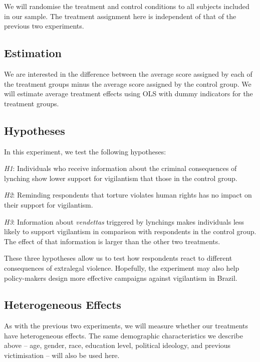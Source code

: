\documentclass[12pt,a4paper,]{article}
\begin{document}
We will randomise the treatment and control conditions to all subjects
included in our sample. The treatment assignment here is independent of
that of the previous two experiments.

\hypertarget{estimation-2}{%
\subsection{Estimation}\label{estimation-2}}

We are interested in the difference between the average score assigned
by each of the treatment groups minus the average score assigned by the
control group. We will estimate average treatment effects using OLS with
dummy indicators for the treatment groups.

\hypertarget{hypotheses-2}{%
\subsection{Hypotheses}\label{hypotheses-2}}

In this experiment, we test the following hypotheses:

\vspace{.5cm}

\noindent \emph{H1}: Individuals who receive information about the
criminal consequences of lynching show lower support for vigilantism
that those in the control group.

\vspace{.3cm}

\noindent \emph{H2}: Reminding respondents that torture violates human
rights has no impact on their support for vigilantism.

\vspace{.3cm}

\noindent \emph{H3}: Information about \emph{vendettas} triggered by
lynchings makes individuals less likely to support vigilantism in
comparison with respondents in the control group. The effect of that
information is larger than the other two treatments.

\vspace{.5cm}

These three hypotheses allow us to test how respondents react to
different consequences of extralegal violence. Hopefully, the experiment
may also help policy-makers design more effective campaigns against
vigilantism in Brazil.

\hypertarget{heterogeneous-effects-2}{%
\subsection{Heterogeneous Effects}\label{heterogeneous-effects-2}}

As with the previous two experiments, we will measure whether our
treatments have heterogeneous effects. The same demographic
characteristics we describe above -- age, gender, race, education level,
political ideology, and previous victimisation -- will also be used
here.

\setlength{\parindent}{0cm}
\setlength{\parskip}{5pt}


\end{document}
